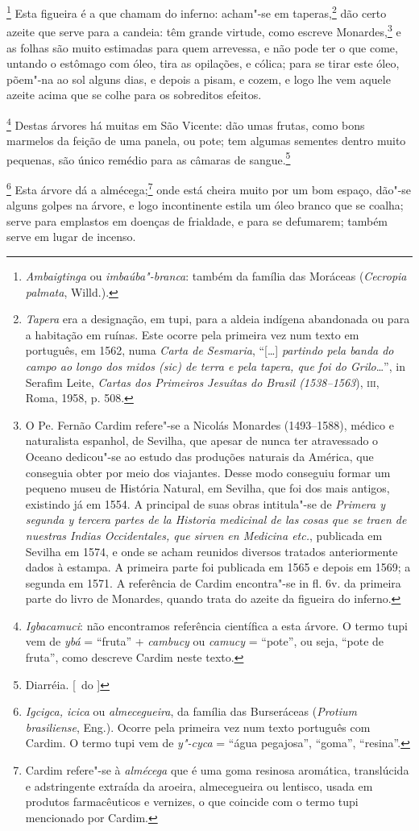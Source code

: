 \footnote{ \textit{Ambaigtinga} ou
\textit{imbaúba"-branca}: também da família das Moráceas
(\textit{Cecropia palmata}, Willd.).} Esta figueira é a
que chamam do inferno: acham"-se em taperas,\footnote{ \textit{Tapera}
era a designação, em tupi, para a aldeia indígena abandonada ou para a
habitação em ruínas. Este ocorre pela primeira vez num texto em
português, em 1562, numa \textit{Carta de Sesmaria}, ``[\ldots{}] 
\textit{partindo pela banda do campo ao longo dos midos (sic) de terra
e pela tapera, que foi do Grilo}\ldots{}'', in Serafim Leite,
\textit{Cartas dos Primeiros Jesuítas do Brasil (1538--1563}), \textsc{iii},
Roma, 1958, p. 508.} dão certo azeite que serve para a candeia: têm
grande virtude, como escreve Monardes,\footnote{ O Pe. Fernão Cardim
refere"-se a Nicolás Monardes (1493--1588), médico e naturalista espanhol, de Sevilha, 
que apesar de nunca ter atravessado o Oceano dedicou"-se ao
estudo das produções naturais da América, que conseguia obter por meio
dos viajantes. Desse modo conseguiu formar um pequeno museu de
História Natural, em Sevilha, que foi dos mais antigos, existindo já em
1554. A principal de suas obras intitula"-se de \textit{Primera y
segunda y tercera partes de la Historia medicinal de las cosas que se
traen de nuestras Indias Occidentales, que sirven en Medicina etc.}, 
publicada em Sevilha em 1574, e onde se acham reunidos diversos
tratados anteriormente dados à estampa. A primeira parte foi publicada
em 1565 e depois em 1569; a segunda em 1571. A referência de Cardim
encontra"-se in fl. 6v. da primeira parte do livro de Monardes, quando
trata do azeite da figueira do inferno.} e as folhas são muito
estimadas para quem arrevessa, e não pode ter o que come, untando o
estômago com óleo, tira as opilações, e cólica; para se tirar este
óleo, põem"-na ao sol alguns dias, e depois a pisam, e cozem, e logo lhe
vem aquele azeite acima que se colhe para os sobreditos efeitos. 

\footnote{ \textit{Igbacamuci}: não encontramos
referência científica a esta árvore. O termo tupi vem de
\textit{ybá} = ``fruta'' + \textit{cambucy} ou \textit{camucy} = ``pote'',
ou seja, ``pote de fruta'', como descreve Cardim neste texto.} 
Destas árvores há muitas em São Vicente: dão umas frutas,
como bons marmelos da feição de uma panela, ou pote; tem algumas
sementes dentro muito pequenas, são único remédio para as câmaras de sangue.\footnote{ Diarréia. [~do ]}

\footnote{ \textit{Igcigca, icica} ou
\textit{almecegueira}, da família das Burseráceas (\textit{Protium
brasiliense}, Eng.). Ocorre pela primeira vez num texto português com
Cardim. O termo tupi vem de \textit{y"-cyca} = ``água pegajosa'', ``goma'',
``resina''.} Esta árvore dá a almécega;\footnote{ Cardim
refere"-se à \textit{almécega} que é uma goma resinosa aromática,
translúcida e adstringente extraída da aroeira, almecegueira ou
lentisco, usada em produtos farmacêuticos e vernizes, o que coincide
com o termo tupi mencionado por Cardim.} onde está cheira muito por um
bom espaço, dão"-se alguns golpes na árvore, e logo incontinente estila
um óleo branco que se coalha; serve para emplastos em doenças de
frialdade, e para se defumarem; também serve em lugar de incenso.

